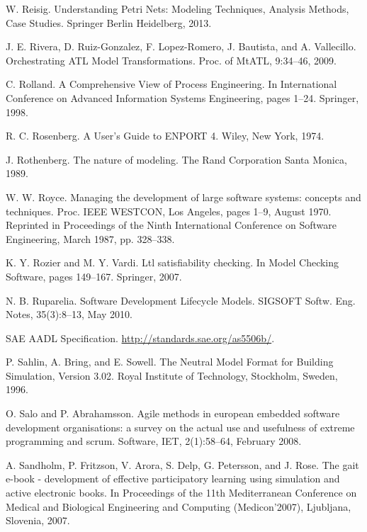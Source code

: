 \begin{description}[style=nextline,leftmargin=12mm,labelwidth=10mm,font=\normalfont]
\item[{[239]}] W. Reisig. Understanding Petri Nets: Modeling Techniques, Analysis Methods, Case Studies. Springer Berlin Heidelberg, 2013.

\item[{[240]}] J. E. Rivera, D. Ruiz-Gonzalez, F. Lopez-Romero, J. Bautista, and A. Vallecillo. Orchestrating ATL Model Transformations. Proc. of MtATL, 9:34–46, 2009.

\item[{[241]}] C. Rolland. A Comprehensive View of Process Engineering. In International Conference on Advanced Information Systems Engineering, pages 1–24. Springer, 1998.

\item[{[242]}] R. C. Rosenberg. A User’s Guide to ENPORT 4. Wiley, New York, 1974.

\item[{[243]}] J. Rothenberg. The nature of modeling. The Rand Corporation Santa Monica, 1989.

\item[{[244]}] W. W. Royce. Managing the development of large software systems: concepts and techniques. Proc. IEEE WESTCON, Los Angeles, pages 1–9, August 1970. Reprinted in Proceedings of the Ninth International Conference on Software Engineering, March 1987, pp. 328–338.

\item[{[245]}] K. Y. Rozier and M. Y. Vardi. Ltl satisfiability checking. In Model Checking Software, pages 149–167. Springer, 2007.

\item[{[246]}] N. B. Ruparelia. Software Development Lifecycle Models. SIGSOFT Softw. Eng. Notes, 35(3):8–13, May 2010.

\item[{[247]}] SAE AADL Specification. \url{http://standards.sae.org/as5506b/}.

\item[{[248]}] P. Sahlin, A. Bring, and E. Sowell. The Neutral Model Format for Building Simulation, Version 3.02. Royal Institute of Technology, Stockholm, Sweden, 1996.

\item[{[249]}] O. Salo and P. Abrahamsson. Agile methods in european embedded software development organisations: a survey on the actual use and usefulness of extreme programming and scrum. Software, IET, 2(1):58–64, February 2008.

\item[{[250]}] A. Sandholm, P. Fritzson, V. Arora, S. Delp, G. Petersson, and J. Rose. The gait e-book - development of effective participatory learning using simulation and active electronic books. In Proceedings of the 11th Mediterranean Conference on Medical and Biological Engineering and Computing (Medicon’2007), Ljubljana, Slovenia, 2007.


\end{description}
